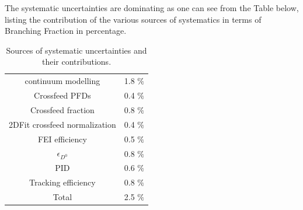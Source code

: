 
\vspace{0.2 cm}
\noindent The systematic uncertainties are dominating as one can see from the Table below, listing the contribution of the various sources of systematics in terms of Branching Fraction in percentage.\\


\vspace{0.1 cm}
\begin{table}[H]
\label{tab:chargedControlSyst}
\centering
\begin{tabular}{c|c}
 continuum   modelling & 1.8 $\%$\\
Crossfeed PFDs    & 0.4 $\%$\\
Crossfeed fraction      &  0.8 $\%$ \\
2DFit crossfeed normalization & 0.4 $\%$ \\
 FEI efficiency    & 0.5 $\%$ \\
   $\epsilon_{D^0} $   & 0.8 $\%$ \\
 PID    & 0.6 $\%$ \\
 Tracking efficiency  & 0.8 $\%$\\
 \hline
 Total & 2.5 $\%$
\end{tabular}

\caption{Sources of systematic uncertainties and their contributions.}

\end{table}
